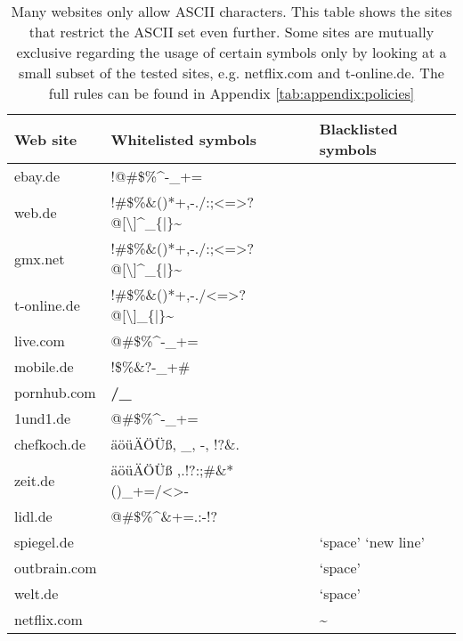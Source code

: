 \begin{table}[htbp]
\small
\centering
	\begin{tabular}{lll}
		\textbf{Web site} & \textbf{Whitelisted symbols} & \textbf{Blacklisted symbols}\\ \hline
		ebay.de & !@\#\$\%\textasciicircum*-\_+= & \\
		web.de & !\#\$\%\&()*+,-./:;<=>?@[\textbackslash]\textasciicircum\_\{|\}\textasciitilde{}{\ss} & \\
		gmx.net & !\#\$\%\&()*+,-./:;<=>?@[\textbackslash]\textasciicircum\_\{|\}\textasciitilde{}{\ss} &\\
		t-online.de & !\#\$\%\&()*+,-./<=>?@[\textbackslash]\_\{|\}\textasciitilde &\\
		live.com & @\#\$\%\textasciicircum*-\_+= &\\
		mobile.de & !\$\%\&?-\_+\# & \\
		pornhub.com & \textbf{/\_} & \\
		1und1.de & @\#\$\%\textasciicircum*-\_+= &\\
		chefkoch.de & äöüÄÖÜ{\ss}, \_, -, !?\&. &\\
		zeit.de & äöüÄÖÜ{\ss} ,.!?:;\#\&* ()\_+=/<>- &\\
		lidl.de & @\#\$\%\textasciicircum\&+=.:-!? &\\
		\bottomrule
		spiegel.de & & `space' `new line' \\
        outbrain.com & & `space' \\
   		welt.de & & `space' \\
   		netflix.com & & \textasciitilde \\
	\end{tabular}
	\caption{
		Many websites only allow ASCII characters. This table shows the sites that restrict the ASCII set even further. Some sites are mutually exclusive regarding the usage of certain symbols only by looking at a small subset of the tested sites, e.g. netflix.com and t-online.de. The full rules can be found in Appendix \ref{tab:appendix:policies}
	}
	\label{tab:policies_reuse:black-white-lists}
\end{table}